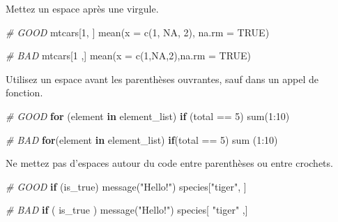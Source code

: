 \documentclass[
  french,
]{scrbook}
\newenvironment{Shaded}{\begin{snugshade}}{\end{snugshade}}
\newcommand{\AttributeTok}[1]{\textcolor[rgb]{0.77,0.63,0.00}{#1}}
\newcommand{\CommentTok}[1]{\textcolor[rgb]{0.56,0.35,0.01}{\textit{#1}}}
\newcommand{\ConstantTok}[1]{\textcolor[rgb]{0.00,0.00,0.00}{#1}}
\newcommand{\ControlFlowTok}[1]{\textcolor[rgb]{0.13,0.29,0.53}{\textbf{#1}}}
\newcommand{\DecValTok}[1]{\textcolor[rgb]{0.00,0.00,0.81}{#1}}
\newcommand{\FunctionTok}[1]{\textcolor[rgb]{0.00,0.00,0.00}{#1}}
\newcommand{\NormalTok}[1]{#1}
\newcommand{\SpecialCharTok}[1]{\textcolor[rgb]{0.00,0.00,0.00}{#1}}
\newcommand{\StringTok}[1]{\textcolor[rgb]{0.31,0.60,0.02}{#1}}
\begin{document}
Mettez un espace après une virgule.

\begin{Shaded}
\begin{Highlighting}[]
\CommentTok{\# GOOD }
\NormalTok{mtcars[}\DecValTok{1}\NormalTok{, ]}
\FunctionTok{mean}\NormalTok{(}\AttributeTok{x =} \FunctionTok{c}\NormalTok{(}\DecValTok{1}\NormalTok{, }\ConstantTok{NA}\NormalTok{, }\DecValTok{2}\NormalTok{), }\AttributeTok{na.rm =} \ConstantTok{TRUE}\NormalTok{)}

\CommentTok{\# BAD}
\NormalTok{mtcars[}\DecValTok{1}\NormalTok{ ,]}
\FunctionTok{mean}\NormalTok{(}\AttributeTok{x =} \FunctionTok{c}\NormalTok{(}\DecValTok{1}\NormalTok{,}\ConstantTok{NA}\NormalTok{,}\DecValTok{2}\NormalTok{),}\AttributeTok{na.rm =} \ConstantTok{TRUE}\NormalTok{)}
\end{Highlighting}
\end{Shaded}

Utilisez un espace avant les parenthèses ouvrantes, sauf dans un appel de fonction.

\begin{Shaded}
\begin{Highlighting}[]
\CommentTok{\# GOOD }
\ControlFlowTok{for}\NormalTok{ (element }\ControlFlowTok{in}\NormalTok{ element\_list)}
\ControlFlowTok{if}\NormalTok{ (total }\SpecialCharTok{==} \DecValTok{5}\NormalTok{)}
\FunctionTok{sum}\NormalTok{(}\DecValTok{1}\SpecialCharTok{:}\DecValTok{10}\NormalTok{)}

\CommentTok{\# BAD}
\ControlFlowTok{for}\NormalTok{(element }\ControlFlowTok{in}\NormalTok{ element\_list)}
\ControlFlowTok{if}\NormalTok{(total }\SpecialCharTok{==} \DecValTok{5}\NormalTok{)}
\FunctionTok{sum}\NormalTok{ (}\DecValTok{1}\SpecialCharTok{:}\DecValTok{10}\NormalTok{)}
\end{Highlighting}
\end{Shaded}

Ne mettez pas d'espaces autour du code entre parenthèses ou entre crochets.

\begin{Shaded}
\begin{Highlighting}[]
\CommentTok{\# GOOD }
\ControlFlowTok{if}\NormalTok{ (is\_true) }\FunctionTok{message}\NormalTok{(}\StringTok{"Hello!"}\NormalTok{)}
\NormalTok{species[}\StringTok{"tiger"}\NormalTok{, ]}

\CommentTok{\# BAD}
\ControlFlowTok{if}\NormalTok{ ( is\_true ) }\FunctionTok{message}\NormalTok{(}\StringTok{"Hello!"}\NormalTok{)}
\NormalTok{species[ }\StringTok{"tiger"}\NormalTok{ ,]}
\end{Highlighting}
\end{Shaded}
\end{document}
